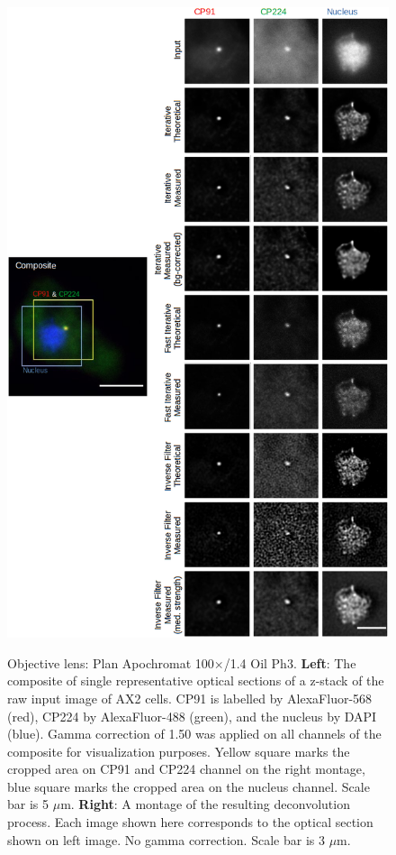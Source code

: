 \begin{figure}
\centering
\includegraphics[height=0.85\textheight]{Exp_7_Deconvolution/Figures/montagemerged3t}\\
\caption{Objective lens: Plan Apochromat 100$\times$/1.4 Oil Ph3. \textbf{Left}: The composite of single representative optical sections of a z-stack of the raw input image of AX2 cells. CP91 is labelled by AlexaFluor-568 (red), CP224 by AlexaFluor-488 (green), and the nucleus by DAPI (blue). 
Gamma correction of 1.50 was applied on all channels of the composite for visualization purposes. 
Yellow square marks the cropped area on CP91 and CP224 channel on the right montage, blue square marks the cropped area on the nucleus channel. 
Scale bar is 5 $\mu$m. \textbf{Right}: A montage of the resulting deconvolution process. 
Each image shown here corresponds to the optical section shown on left image. 
No gamma correction. 
Scale bar is 3 $\mu$m.}
\label{fig:ax2mon}
\end{figure}

